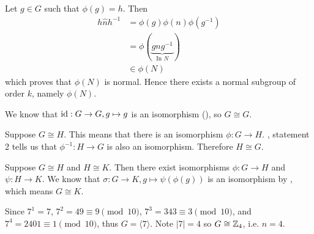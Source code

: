 \begin{questions}
    Let $g \in G$ such that $\phi(g) = h$. Then
    \begin{align*}
        h\hat{n}h^{-1} &= \phi(g)\phi(n)\phi(g^{-1})\\
        &= \phi(\underbrace{gng^{-1}}_{\text{In } N})\\
        &\in \phi(N)
    \end{align*}
    which proves that $\phi(N)$ is normal. Hence there exists a normal subgroup of order $k$, namely $\phi(N)$.

    \item \begin{partquestions}{\alph*}
        \item We know that $\mathrm{id}: G \to G, g \mapsto g$ is an isomorphism (), so $G \cong G$.
        \item Suppose $G \cong H$. This means that there is an isomorphism $\phi: G \to H$. , statement 2 tells us that $\phi^{-1}: H \to G$ is also an isomorphism. Therefore $H \cong G$.
        \item Suppose $G \cong H$ and $H \cong K$. Then there exist isomorphisms $\phi: G \to H$ and $\psi: H \to K$. We know that $\sigma: G \to K, g \mapsto \psi(\phi(g))$ is an isomorphism by , which means $G \cong K$.
    \end{partquestions}

    \item Since $7^1 = 7$, $7^2 = 49 \equiv 9 \pmod{10}$, $7^3 = 343 \equiv 3 \pmod{10}$, and $7^4 = 2401 \equiv 1 \pmod{10}$, thus $G = \langle 7 \rangle$. Note $|7| = 4$ so $G \cong \mathbb{Z}_4$, i.e. $n = 4$.
\end{questions}

